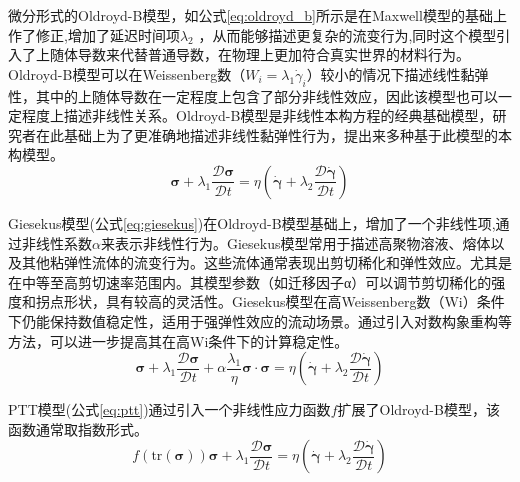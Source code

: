 微分形式的Oldroyd-B模型，如公式\eqref{eq:oldroyd_b}所示是在Maxwell模型的基础上作了修正,增加了延迟时间项$\lambda_2$ ，从而能够描述更复杂的流变行为,同时这个模型引入了上随体导数来代替普通导数，在物理上更加符合真实世界的材料行为\cite{oldroyd1958non}。Oldroyd-B模型可以在Weissenberg数（$W_i=\lambda_1 \dot{\gamma}_i$）较小的情况下描述线性黏弹性，其中的上随体导数在一定程度上包含了部分非线性效应，因此该模型也可以一定程度上描述非线性关系。Oldroyd-B模型是非线性本构方程的经典基础模型，研究者在此基础上为了更准确地描述非线性黏弹性行为，提出来多种基于此模型的本构模型。
\begin{equation}
  \boldsymbol{\sigma} + \lambda_1 \frac{\mathcal{D}\boldsymbol{\sigma}}{\mathcal{D}t} = \eta \left( \dot{\boldsymbol{\gamma}} + \lambda_2 \frac{\mathcal{D}\dot{\boldsymbol{\gamma}}}{\mathcal{D}t} \right) \label{eq:oldroyd_b}
\end{equation}

Giesekus模型(公式\eqref{eq:giesekus})在Oldroyd-B模型基础上，增加了一个非线性项,通过非线性系数$\alpha$来表示非线性行为\cite{giesekus1982simple}。Giesekus模型常用于描述高聚物溶液、熔体以及其他粘弹性流体的流变行为。这些流体通常表现出剪切稀化和弹性效应。尤其是在中等至高剪切速率范围内。其模型参数（如迁移因子α）可以调节剪切稀化的强度和拐点形状，具有较高的灵活性\cite{PENG2021104571,kim2024viscosity}。Giesekus模型在高Weissenberg数（Wi）条件下仍能保持数值稳定性，适用于强弹性效应的流动场景。通过引入对数构象重构等方法，可以进一步提高其在高Wi条件下的计算稳定性\cite{fattal2004constitutive}。
\begin{equation}
  \boldsymbol{\sigma} + \lambda_1 \frac{\mathcal{D}\boldsymbol{\sigma}}{\mathcal{D}t} + \alpha \frac{\lambda_1}{\eta} \boldsymbol{\sigma} \cdot \boldsymbol{\sigma} = \eta \left( \dot{\boldsymbol{\gamma}} + \lambda_2 \frac{\mathcal{D}\dot{\boldsymbol{\gamma}}}{\mathcal{D}t} \right) \label{eq:giesekus}
\end{equation}

PTT模型(公式\eqref{eq:ptt})通过引入一个非线性应力函数$f$扩展了Oldroyd-B模型，该函数通常取指数形式\cite{thien1977new}。
\begin{equation}
  f(\text{tr}(\boldsymbol{\sigma})) \boldsymbol{\sigma} + \lambda_1 \frac{\mathcal{D}\boldsymbol{\sigma}}{\mathcal{D}t} = \eta \left( \dot{\boldsymbol{\gamma}} + \lambda_2 \frac{\mathcal{D}\dot{\boldsymbol{\gamma}}}{\mathcal{D}t} \right) \label{eq:ptt}
\end{equation}


